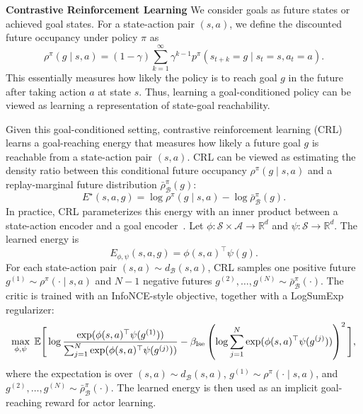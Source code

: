 \textbf{Contrastive Reinforcement Learning} We consider goals as future states or achieved goal states. For a state-action pair $(s,a)$, we define the discounted future occupancy under policy $\pi$ as
\begin{equation*}
    \rho^\pi(g\mid s,a)
    =
    (1-\gamma)\sum_{k=1}^{\infty}\gamma^{k-1}
    p^\pi(s_{t+k}=g\mid s_t=s,a_t=a).
\end{equation*}
This essentially measures how likely the policy is to reach goal $g$ in the future after taking action $a$ at state $s$. Thus, learning a goal-conditioned policy can be viewed as learning a representation of state-goal reachability.

Given this goal-conditioned setting, contrastive reinforcement learning (CRL)~\citep{eysenbach2022contrastive} learns a goal-reaching energy that measures how likely a future goal $g$ is reachable from a state-action pair $(s,a)$. CRL can be viewed as estimating the density ratio between this conditional future occupancy $\rho^\pi(g\mid s,a)$ and a replay-marginal future distribution $\bar{\rho}^{\pi}_{\mathcal{B}}(g)$:
\begin{equation}
    E^\star(s,a,g)
    =
    \log \rho^\pi(g\mid s,a)
    -
    \log \bar{\rho}^{\pi}_{\mathcal{B}}(g).
\end{equation}
In practice, CRL parameterizes this energy with an inner product between a state-action encoder and a goal encoder~\citep{eysenbach2022contrastive,liu2025singlegoal}. Let
$\phi:\mathcal{S}\times\mathcal{A}\rightarrow\mathbb{R}^d$
and
$\psi:\mathcal{S}\rightarrow\mathbb{R}^d$.
The learned energy is
\begin{equation}
    E_{\phi,\psi}(s,a,g)=\phi(s,a)^\top\psi(g).
\label{eq:inner_energy}
\end{equation}
For each state-action pair $(s,a)\sim d_{\mathcal{B}}(s,a)$, CRL samples one positive future
$g^{(1)}\sim\rho^\pi(\cdot\mid s,a)$
and $N-1$ negative futures
$g^{(2)},\ldots,g^{(N)}\sim\bar{\rho}^{\pi}_{\mathcal{B}}(\cdot)$.
The critic is trained with an InfoNCE-style objective, together with a LogSumExp regularizer:
\begin{equation}
  \max_{\phi,\psi}\;
  \mathbb{E}
  \Bigg[
  \log
  \frac{
  \exp(\phi(s,a)^\top\psi(g^{(1)}))
  }{
  \sum_{j=1}^N \exp(\phi(s,a)^\top\psi(g^{(j)}))
  }
  -
  \beta_{\rm lse}
  \left(
  \log\sum_{j=1}^N \exp(\phi(s,a)^\top\psi(g^{(j)}))
  \right)^2
  \Bigg],
  \label{eq:sgcrl-critic-objective}
\end{equation}
where the expectation is over
$(s,a)\sim d_{\mathcal{B}}(s,a)$,
$g^{(1)}\sim\rho^\pi(\cdot\mid s,a)$, and
$g^{(2)},\ldots,g^{(N)}\sim\bar{\rho}^{\pi}_{\mathcal{B}}(\cdot)$.
The learned energy is then used as an implicit goal-reaching reward for actor learning.

